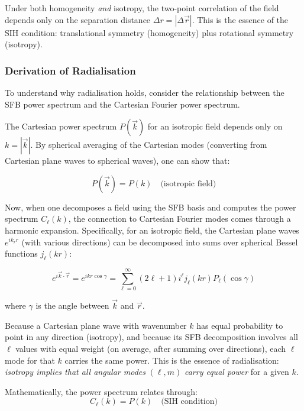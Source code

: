 Under both homogeneity \emph{and} isotropy, the two-point correlation of the field depends only on the separation distance $\Delta r = |\Delta \vec{r}|$. This is the essence of the SIH condition: translational symmetry (homogeneity) plus rotational symmetry (isotropy).

\subsubsection{Derivation of Radialisation}

To understand why radialisation holds, consider the relationship between the SFB power spectrum and the Cartesian Fourier power spectrum.

The Cartesian power spectrum $P(\vec{k})$ for an isotropic field depends only on $k = |\vec{k}|$. By spherical averaging of the Cartesian modes (converting from Cartesian plane waves to spherical waves), one can show that:

\begin{equation}
P(\vec{k}) = P(k) \quad \text{(isotropic field)}
\end{equation}

Now, when one decomposes a field using the SFB basis and computes the power spectrum $C_\ell(k)$, the connection to Cartesian Fourier modes comes through a harmonic expansion. Specifically, for an isotropic field, the Cartesian plane waves $e^{i k_r r}$ (with various directions) can be decomposed into sums over spherical Bessel functions $j_\ell(kr)$:

\begin{equation}
e^{i \vec{k} \cdot \vec{r}} = e^{i k r \cos\gamma} = \sum_{\ell=0}^{\infty} (2\ell+1) i^\ell j_\ell(kr) P_\ell(\cos\gamma)
\end{equation}

where $\gamma$ is the angle between $\vec{k}$ and $\vec{r}$.

Because a Cartesian plane wave with wavenumber $k$ has equal probability to point in any direction (isotropy), and because its SFB decomposition involves all $\ell$ values with equal weight (on average, after summing over directions), each $\ell$ mode for that $k$ carries the same power. This is the essence of radialisation: \emph{isotropy implies that all angular modes} $(\ell, m)$ \emph{carry equal power} for a given $k$.

Mathematically, the power spectrum relates through:
\begin{equation}
C_\ell(k) = P(k) \quad \text{(SIH condition)}
\end{equation}

